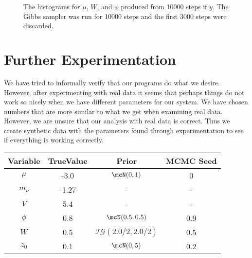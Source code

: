 \documentclass{article}
\begin{document}
\begin{figure}[!h]
\begin{center}
\end{center}
\label{DLM4:histograms}
\caption{The histograms for $\mu$, $W$, and $\phi$ produced from 10000 steps if $y$.  The Gibbs sampler was run for 10000 steps and the first 3000 steps were discarded.}
\end{figure}

\begin{figure}[!h]
\begin{center}
\end{center}
\end{figure}

\section{Further Experimentation}

We have tried to informally verify that our programs do what we desire.  However, after experimenting with real data it seems that perhaps things do not work so nicely when we have different parameters for our system.  We have chosen numbers that are more similar to what we get when examining real data.  However, we are unsure that our analysis with real data is correct.  Thus we create synthetic data with the parameters found through experimentation to see if everything is working correctly.

\begin{center}
\begin{tabular}{c | c | c | c}
Variable & TrueValue & Prior & MCMC Seed\\
\hline
$\mu$ & -3.0 & $\mcN(0, 1)$ & 0 \\
\hline
$m_\nu$ & -1.27 & - & - \\
\hline
$V$ & 5.4 & - & - \\
\hline
$\phi$ & 0.8 & $\mcN(0.5, 0.5)$ & 0.9 \\
\hline
$W$ & 0.5 & $\mathcal{IG}(2.0/2, 2.0/2)$ & 0.5 \\
\hline
$z_0$ & 0.1 & $\mcN(0,5)$ & 0.2
\end{tabular}
\end{center}
\end{document}
